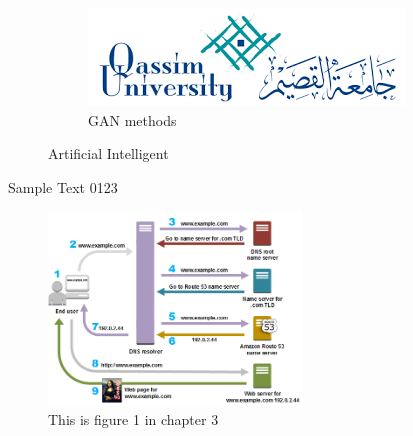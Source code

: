 \begin{figure}[ht]
\begin{subfigure}{.22\textwidth}
        \label{fig:sub3}
        \end{subfigure}
        \begin{subfigure}{.22\textwidth}
         \centering
          \includegraphics[width=.8\linewidth]{figures/samples/qu.png}
           \caption{GAN methods}
        \label{fig:sub4}
        \end{subfigure}%
        \caption{Artificial Intelligent}
\label{fig:test}
\end{figure}


\textsf{Sample Text 0123}
\hfill \break
\hfill \break
\hfill \break\hfill \break
\hfill \break
\hfill \break\hfill \break
\hfill \break
\hfill \break\hfill \break
\hfill \break
\hfill \break\hfill \break
\hfill \break
\hfill \break
\hfill \break
\hfill \break
\hfill \break\hfill \break
\hfill \break
\hfill \break\hfill \break
\hfill \break
\hfill \break\hfill \break
\hfill \break
\hfill \break
\hfill \break
\hfill \break
\hfill \break
\hfill \break
\hfill \break
\hfill \break
\hfill \break
\hfill \break
\hfill \break
\hfill \break
\hfill \break
\hfill \break
\hfill \break
\hfill \break
\hfill \break
\hfill \break







\begin{figure}[ht]
\begin{center}
\includegraphics[width=0.6\textwidth]{figures/samples/Fig1.png}
\caption{This is figure 1 in chapter 3}
\label{fig10}
\end{center}
\end{figure}

